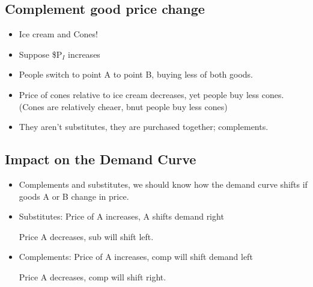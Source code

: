 \documentclass{article}
\begin{document}
\subsection{Complement good price change}
\begin{itemize}
  \item Ice cream and Cones!
  \item Suppose \$P$_I$ increases
  \item People switch to point A to point B, buying less of both goods.
  \item Price of cones relative to ice cream decreases, yet people buy less cones.
    (Cones are relatively cheaer, bnut people buy less cones)
  \item They aren't substitutes, they are purchased together; complements.
\end{itemize}

\subsection{Impact on the Demand Curve}
\begin{itemize}
  \item Complements and substitutes,
    we should know how the demand curve shifts if
    goods A or B change in price.
  \item Substitutes: Price of A increases, A shifts demand right

    Price A decreases, sub will shift left.
  \item Complements: Price of A increases, comp will shift demand left

    Price A decreases, comp will shift right.
\end{itemize}
\end{document}
